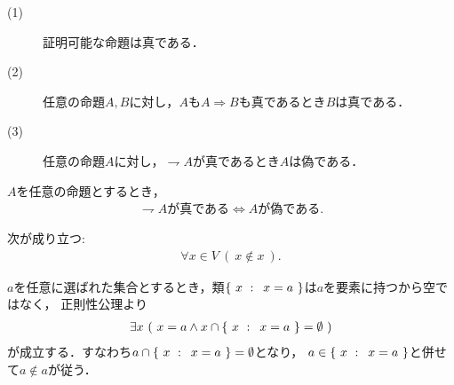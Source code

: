 	\begin{screen}
		\begin{axm}[論理の公理]\mbox{}
			\begin{description}
				\item[(1)] 証明可能な命題は真である．
				\item[(2)] 任意の命題$A,B$に対し，$A$も$A \Longrightarrow B$も真であるとき$B$は真である．
				\item[(3)] 任意の命題$A$に対し，$\rightharpoondown A$が真であるとき$A$は偽である．
			\end{description}
		\end{axm}
	\end{screen}
	
	\begin{screen}
		\begin{thm}
			$A$を任意の命題とするとき，
			\begin{align}
				\mbox{$\rightharpoondown A$が真である} \Longleftrightarrow \mbox{$A$が偽である}.
			\end{align}
		\end{thm}
	\end{screen}
	
	\begin{screen}
		\begin{thm}[いかなる集合も自分自身を要素に持たない]
			次が成り立つ:
			\begin{align}
				\forall x \in V\ (\ x \notin x\ ).
			\end{align}
		\end{thm}
	\end{screen}
	
	\begin{prf}
		$a$を任意に選ばれた集合とするとき，類$\left\{\ x\, \, : \, \, \, x=a\ \right\}$は$a$を要素に持つから空ではなく，
		正則性公理より
		\begin{align}
			\exists x\ (\ x = a \wedge x \cap \Set{x}{x=a} = \emptyset\ )
		\end{align}
		が成立する．すなわち$a \cap \left\{\ x\, \, : \, \, \, x=a\ \right\} = \emptyset$となり，
		$a \in \left\{\ x\, \, : \, \, \, x=a\ \right\}$と併せて$a \notin a$が従う．
		\QED
	\end{prf}
	
	\begin{screen}
		\begin{thm}
			
		\end{thm}
	\end{screen}
	
